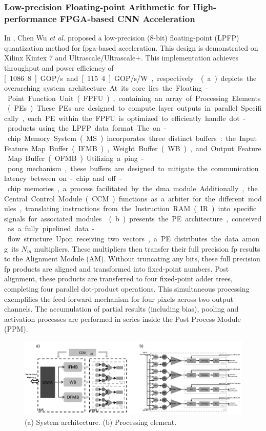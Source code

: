 \subsubsection{Low-precision Floating-point Arithmetic for High-performance FPGA-based CNN Acceleration}
In \cite{wu2021low}, Chen Wu \textit{et al.} proposed a low-precision (8-bit) floating-point (LPFP) quantization method for \gls{fpga}-based acceleration. This design is demonstrated on Xilinx Kintex 7 and Ultrascale/Ultrascale+. This implementation achieves throughput and power efficiency of \unit[1086.8]{GOP/s} and \unit[115.4]{GOP/s/W}, respectively.

(a) depicts the overarching system architecture. At its core lies the Floating-Point Function Unit (FPFU), containing an array of Processing Elements (PEs). These PEs are designed to compute layer outputs in parallel. Specifically, each PE within the FPFU is optimized to efficiently handle dot-products using the LPFP data format. The on-chip Memory System (MS) incorporates three distinct buffers: the Input Feature Map Buffer (IFMB), Weight Buffer (WB), and Output Feature Map Buffer (OFMB). Utilizing a ping-pong mechanism, these buffers are designed to mitigate the communication latency between on-chip and off-chip memories, a process facilitated by the \gls{dma} module. Additionally, the Central Control Module (CCM) functions as a arbiter for the different modules, translating instructions from the Instruction RAM (IR) into specific signals for associated modules.

(b) presents the PE architecture, conceived as a fully pipelined data-flow structure. Upon receiving two vectors, a PE distributes the data among its $N_m$ multipliers. These multipliers then transfer their full precision \gls{fp} results to the Alignment Module (AM). Without truncating any bits, these full precision \gls{fp} products are aligned and transformed into fixed-point numbers. Post alignment, these products are transferred to four fixed-point adder trees, completing four parallel dot-product operations. This simultaneous processing exemplifies the feed-forward mechanism for four pixels across two output channels. The accumulation of partial results (including bias), pooling and activation processes are performed in series inside the Post Process Module (PPM).

\begin{figure}[h!]
	\centering
	\includegraphics[width=\textwidth]{./figures/2_g.png}
	\caption{(a) System architecture. (b) Processing element.}
	\label{fig:wu2021low}
\end{figure}

